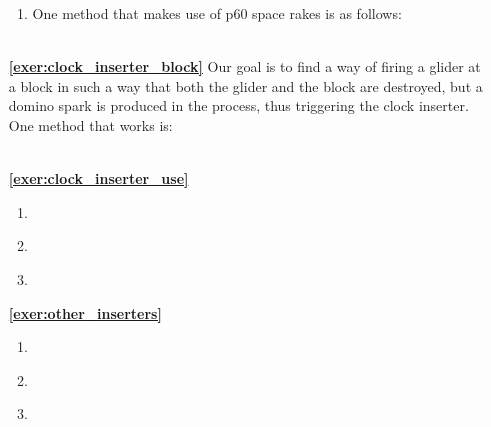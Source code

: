 \begin{multicols}{2}
\begin{itemize}[leftmargin=0em]
\begin{enumerate}[leftmargin=1.5em,label=\bf\color{ocre}(\alph*)]
		\item One method that makes use of p$60$ space rakes is as follows:\\[-0.6em]
		
		 \\
	\end{enumerate}


	\item[\bf\color{ocre}\sffamily\ref{exer:clock_inserter_block}] Our goal is to find a way of firing a glider at a block in such a way that both the glider and the block are destroyed, but a domino spark is produced in the process, thus triggering the clock inserter. One method that works is:\\[-0.6em]
	
	 \\
	
	
	\item[\bf\color{ocre}\sffamily\ref{exer:clock_inserter_use}]
	\begin{enumerate}[leftmargin=1.5em,label=\bf\color{ocre}(\alph*)]
		\item {} \\
		
		\item {} \\
		
		\item {} \\
	\end{enumerate}
	

	\item[\bf\color{ocre}\sffamily\ref{exer:other_inserters}]
	\begin{enumerate}[leftmargin=1.5em,label=\bf\color{ocre}(\alph*)]
		\item {} \\
		
		\item {} \\
		
		\item {} \\
	\end{enumerate}
	

\end{itemize}
\end{multicols}
